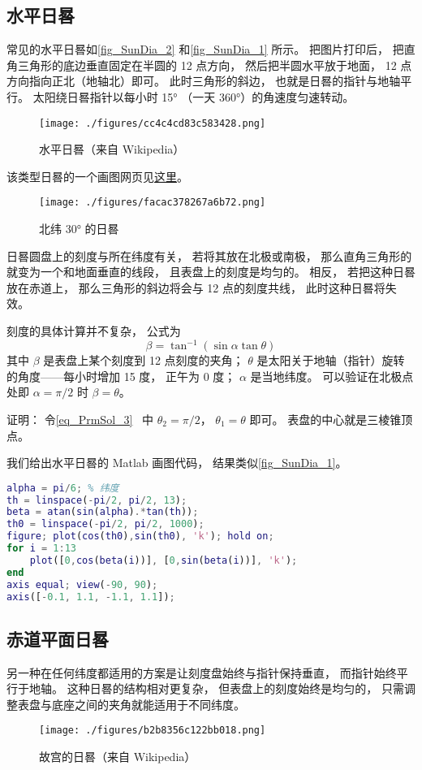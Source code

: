 
\begin{issues}
\end{issues}

\subsection{水平日晷}

常见的水平日晷如\autoref{fig_SunDia_2} 和\autoref{fig_SunDia_1} 所示。 把图片打印后， 把直角三角形的底边垂直固定在半圆的 12 点方向， 然后把半圆水平放于地面， 12 点方向指向正北（地轴北）即可。 此时三角形的斜边， 也就是日晷的指针与地轴平行。 太阳绕日晷指针以每小时 15° （一天 360°）的角速度匀速转动。

\begin{figure}[ht]
\centering
\texttt{[image: ./figures/cc4c4cd83c583428.png]}
\caption{水平日晷（来自 Wikipedia）} \label{fig_SunDia_2}
\end{figure}
该类型日晷的一个画图网页见\href{https://www.blocklayer.com/sundial.aspx}{这里}。
\begin{figure}[ht]
\centering
\texttt{[image: ./figures/facac378267a6b72.png]}
\caption{北纬 30° 的日晷} \label{fig_SunDia_1}
\end{figure}

日晷圆盘上的刻度与所在纬度有关， 若将其放在北极或南极， 那么直角三角形的就变为一个和地面垂直的线段， 且表盘上的刻度是均匀的。 相反， 若把这种日晷放在赤道上， 那么三角形的斜边将会与 12 点的刻度共线， 此时这种日晷将失效。

刻度的具体计算并不复杂， 公式为
\begin{equation}
\beta = \tan^{-1}(\sin\alpha \tan \theta)
\end{equation}
其中 $\beta$ 是表盘上某个刻度到 12 点刻度的夹角； $\theta$ 是太阳关于地轴（指针）旋转的角度——每小时增加 15 度， 正午为 0 度； $\alpha$ 是当地纬度。 可以验证在北极点处即 $\alpha = \pi/2$ 时 $\beta = \theta$。

证明： 令\autoref{eq_PrmSol_3}~ 中 $\theta_2 = \pi/2$， $\theta_1 = \theta$ 即可。 表盘的中心就是三棱锥顶点。

我们给出水平日晷的 Matlab 画图代码， 结果类似\autoref{fig_SunDia_1}。
\begin{lstlisting}[language=matlab, caption=sunDial.m]
alpha = pi/6; % 纬度
th = linspace(-pi/2, pi/2, 13);
beta = atan(sin(alpha).*tan(th));
th0 = linspace(-pi/2, pi/2, 1000);
figure; plot(cos(th0),sin(th0), 'k'); hold on;
for i = 1:13
    plot([0,cos(beta(i))], [0,sin(beta(i))], 'k');
end
axis equal; view(-90, 90);
axis([-0.1, 1.1, -1.1, 1.1]);
\end{lstlisting}

\subsection{赤道平面日晷}
另一种在任何纬度都适用的方案是让刻度盘始终与指针保持垂直， 而指针始终平行于地轴。 这种日晷的结构相对更复杂， 但表盘上的刻度始终是均匀的， 只需调整表盘与底座之间的夹角就能适用于不同纬度。
\begin{figure}[ht]
\centering
\texttt{[image: ./figures/b2b8356c122bb018.png]}
\caption{故宫的日晷（来自 Wikipedia）} \label{fig_SunDia_3}
\end{figure}
